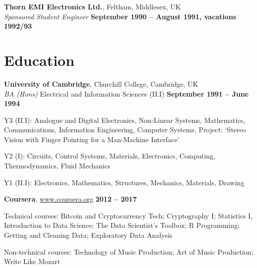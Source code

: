 \documentclass[line]{resume}
\begin{document}
\begin{resume}
    \textbf{Thorn EMI Electronics Ltd.}, Feltham, Middlesex, UK \vspace{2mm}\\\vspace{1mm}%
    \textsl{Sponsored Student Engineer} \hfill \textbf{September 1990 -- August 1991, vacations 1992/93}\vspace{-3mm}\\\vspace{-1mm}%
    \vspace{-1.5mm}


    \section{\mysidestyle Education}

    \textbf{University of Cambridge}, Churchill College, Cambridge, UK \vspace{2mm}\\\vspace{1mm}%
    \textsl{BA (Hons)} Electrical and Information Sciences (II.I)\hfill \textbf{ September 1991 -- June 1994}\vspace{-3mm}\\\vspace{-1mm}%
    \begin{list2}
        \item Y3 (II.I): Analogue and Digital Electronics, Non-Linear Systems, 
            Mathematics, Communications, Information Engineering, Computer Systems, Project: `Stereo Vision with Finger
            Pointing for a Man-Machine Interface'
        \item Y2 (I): Circuits, Control Systems, Materials, Electronics, Computing, Thermodynamics, Fluid Mechanics
        \item Y1 (II.I): Electronics, Mathematics, Structures, Mechanics, Materials,  Drawing
    \end{list2}\vspace{-1.5mm}

    \textbf{Coursera}, \url{www.coursera.org}\hfill \textbf{ 2012 -- 2017}\vspace{-3mm}\\\vspace{-1mm}%
    \begin{list2}
        \item Technical courses: Bitcoin and Cryptocurrency Tech; Cryptography I; Statistics I, Introduction to Data
              Science; The Data Scientist's Toolbox; R Programming; Getting and Cleaning Data; Exploratory Data Analysis
        \item Non-technical courses: Technology of Music Production; Art of Music Production; Write Like Mozart
    \end{list2}\vspace{-1.5mm}


\end{resume}
\end{document}
